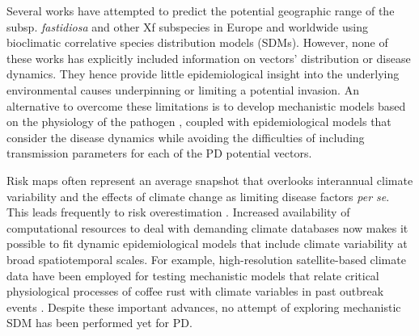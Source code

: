 Several works have attempted to predict the potential geographic range of the
subsp. \textit{fastidiosa} \cite{Bragard2019, Godefroid2019,Hoddle2004} and
other Xf subspecies in Europe \cite{Bosso2016, Schneider2020} and worldwide
\cite{Hoddle2004} using bioclimatic correlative species distribution models
(SDMs). However, none of these works has explicitly included information on
vectors' distribution or disease dynamics. They hence provide little
epidemiological insight into the underlying environmental causes underpinning
or limiting a potential invasion. An alternative to overcome these limitations
is to develop mechanistic models based on the physiology of the pathogen
\cite{Kearney2009}, coupled with epidemiological models that consider the
disease dynamics while avoiding the difficulties of including transmission
parameters for each of the PD potential vectors.

Risk maps often represent an average snapshot that overlooks interannual
climate variability and the effects of climate change as limiting disease
factors \textit{per se}. This leads frequently to risk overestimation
\cite{Bebber2013,Coakley1999,Scherm1994,Truscott2003}. Increased availability
of computational resources to deal with demanding climate databases now makes
it possible to fit dynamic epidemiological models that include climate
variability at broad spatiotemporal scales. For example, high-resolution
satellite-based climate data have been employed for testing mechanistic models
that relate critical physiological processes of coffee rust with climate
variables in past outbreak events \cite{Bebber2016}. Despite these important
advances, no attempt of exploring mechanistic SDM has been performed yet for
PD.

